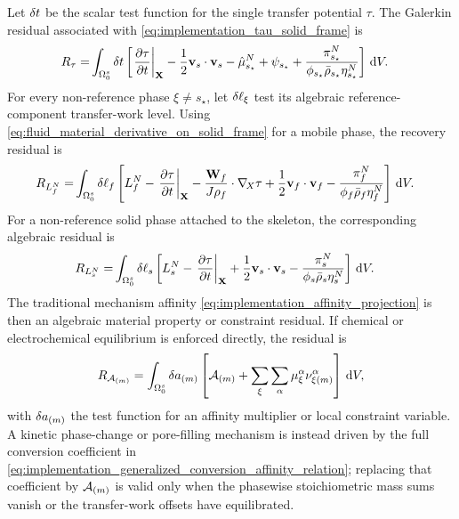 Let \(\delta t\) be the scalar test function for the single transfer potential
\(\tau\).  The Galerkin residual associated with
\eqref{eq:implementation_tau_solid_frame} is
\begin{align}
	R_\tau
	=&
	\int_{\Omega_0^s}
	\delta t
	\left[
		\left.\frac{\partial\tau}{\partial t}\right|_{\mathbf{X}}
		-\frac{1}{2}\mathbf{v}_s\cdot\mathbf{v}_s
		-\hat\mu_{s_\star}^N
		+\psi_{s_\star}
		+\frac{\pi_{s_\star}^N}
		{\phi_{s_\star}\bar\rho_{s_\star}\eta_{s_\star}^N}
	\right]\,\mathrm{d} V .
	\label{eq:tau_evolution_residual}
\end{align}
For every non-reference phase \(\xi\ne s_\star\), let
\(\delta \ell_\xi\) test its algebraic reference-component transfer-work level.
Using \eqref{eq:fluid_material_derivative_on_solid_frame} for a mobile phase,
the recovery residual is
\begin{align}
	R_{L_f^N}
	=&
	\int_{\Omega_0^s}
	\delta \ell_f
	\left[
		L_f^N
		-\left.\frac{\partial\tau}{\partial t}\right|_{\mathbf{X}}
		-\frac{\mathbf{W}_f}{J\rho_f}\cdot\nabla_{\!X}\tau
		+\frac{1}{2}\mathbf{v}_f\cdot\mathbf{v}_f
		-\frac{\pi_f^N}
		{\phi_f\bar\rho_f\eta_f^N}
	\right]\,\mathrm{d} V .
	\label{eq:fluid_transfer_work_recovery_residual}
\end{align}
For a non-reference solid phase attached to the skeleton, the corresponding
algebraic residual is
\begin{align}
	R_{L_s^N}
	=&
	\int_{\Omega_0^s}
	\delta \ell_s
	\left[
		L_s^N
		-\left.\frac{\partial\tau}{\partial t}\right|_{\mathbf{X}}
		+\frac{1}{2}\mathbf{v}_s\cdot\mathbf{v}_s
		-\frac{\pi_s^N}
		{\phi_s\bar\rho_s\eta_s^N}
	\right]\,\mathrm{d} V .
	\label{eq:solid_transfer_work_recovery_residual}
\end{align}
The traditional mechanism affinity
\eqref{eq:implementation_affinity_projection} is then an algebraic material
property or constraint residual.  If chemical or electrochemical equilibrium
is enforced directly, the residual is
\begin{equation}
	R_{\mathcal{A}_{(m)}}=
	\int_{\Omega_0^s}
	\delta a_{(m)}
	\left[
		\mathcal{A}_{(m)}
		+\sum_\xi\sum_\alpha
		\mu_\xi^\alpha
		\nu_{\xi (m)}^\alpha
	\right]\,\mathrm{d} V ,
	\label{eq:affinity_projection_residual}
\end{equation}
with \(\delta a_{(m)}\) the test function for an affinity multiplier or local
constraint variable.  A kinetic phase-change or pore-filling mechanism is
instead driven by the full conversion coefficient in
\eqref{eq:implementation_generalized_conversion_affinity_relation}; replacing
that coefficient by \(\mathcal{A}_{(m)}\) is valid only when the phasewise
stoichiometric mass sums vanish or the transfer-work offsets have equilibrated.

